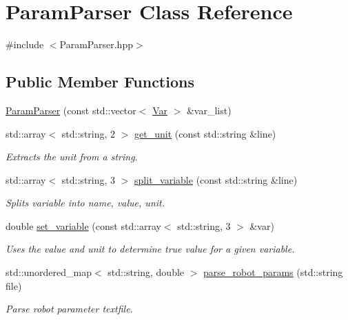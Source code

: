\hypertarget{class_param_parser}{}\section{Param\+Parser Class Reference}
\label{class_param_parser}


{\ttfamily \#include $<$Param\+Parser.\+hpp$>$}

\subsection*{Public Member Functions}
\begin{DoxyCompactItemize}
\item 
\hyperlink{class_param_parser_a1acf0bbc9dd08f878c050d530e2407ce}{Param\+Parser} (const std\+::vector$<$ \hyperlink{struct_var}{Var} $>$ \&var\+\_\+list)
\item 
std\+::array$<$ std\+::string, 2 $>$ \hyperlink{class_param_parser_a93452e252390edc07934ea08f5dce351}{get\+\_\+unit} (const std\+::string \&line)
\begin{DoxyCompactList}\small\item\em Extracts the unit from a string. \end{DoxyCompactList}\item 
std\+::array$<$ std\+::string, 3 $>$ \hyperlink{class_param_parser_a4a57d55f9ccfa1e728763fd6ddc844f3}{split\+\_\+variable} (const std\+::string \&line)
\begin{DoxyCompactList}\small\item\em Splits variable into name, value, unit. \end{DoxyCompactList}\item 
double \hyperlink{class_param_parser_a2c0289b9e481c8aabd8f68a30d15d906}{set\+\_\+variable} (const std\+::array$<$ std\+::string, 3 $>$ \&var)
\begin{DoxyCompactList}\small\item\em Uses the value and unit to determine true value for a given variable. \end{DoxyCompactList}\item 
std\+::unordered\+\_\+map$<$ std\+::string, double $>$ \hyperlink{class_param_parser_ad55f29f701b36351486e4afb8a70b338}{parse\+\_\+robot\+\_\+params} (std\+::string file)
\begin{DoxyCompactList}\small\item\em Parse robot parameter textfile. \end{DoxyCompactList}\end{DoxyCompactItemize}



